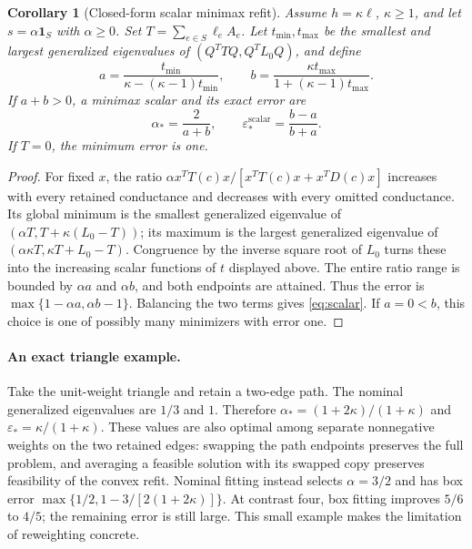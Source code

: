 \documentclass[11pt]{article}
\newtheorem{corollary}[theorem]{Corollary}
\newcommand{\one}{\mathbf 1}
\newcommand{\eps}{\varepsilon}
\begin{document}
\begin{corollary}[Closed-form scalar minimax refit]\label{cor:scalar}
Assume $h=\kappa\ell$, $\kappa\ge1$, and let $s=\alpha\one_S$ with $\alpha\ge0$. Set $T=\sum_{e\in S}\ell_eA_e$. Let $t_{\min},t_{\max}$ be the smallest and largest generalized eigenvalues of $(Q^TTQ,Q^TL_0Q)$, and define
\begin{equation}
a=\frac{t_{\min}}{\kappa-(\kappa-1)t_{\min}},\qquad
b=\frac{\kappa t_{\max}}{1+(\kappa-1)t_{\max}}.
\end{equation}
If $a+b>0$, a minimax scalar and its exact error are
\begin{equation}\label{eq:scalar}
\alpha_*=\frac{2}{a+b},\qquad\eps_*^{\mathrm{scalar}}=\frac{b-a}{b+a}.
\end{equation}
If $T=0$, the minimum error is one.
\end{corollary}
\begin{proof}
For fixed $x$, the ratio $\alpha x^TT(c)x/[x^TT(c)x+x^TD(c)x]$ increases with every retained conductance and decreases with every omitted conductance. Its global minimum is the smallest generalized eigenvalue of $(\alpha T,T+\kappa(L_0-T))$; its maximum is the largest generalized eigenvalue of $(\alpha\kappa T,\kappa T+L_0-T)$. Congruence by the inverse square root of $L_0$ turns these into the increasing scalar functions of $t$ displayed above. The entire ratio range is bounded by $\alpha a$ and $\alpha b$, and both endpoints are attained. Thus the error is $\max\{1-\alpha a,\alpha b-1\}$. Balancing the two terms gives \eqref{eq:scalar}. If $a=0<b$, this choice is one of possibly many minimizers with error one.
\end{proof}

\paragraph{An exact triangle example.}
Take the unit-weight triangle and retain a two-edge path. The nominal generalized eigenvalues are $1/3$ and $1$. Therefore $\alpha_*=(1+2\kappa)/(1+\kappa)$ and $\eps_*=\kappa/(1+\kappa)$. These values are also optimal among separate nonnegative weights on the two retained edges: swapping the path endpoints preserves the full problem, and averaging a feasible solution with its swapped copy preserves feasibility of the convex refit. Nominal fitting instead selects $\alpha=3/2$ and has box error $\max\{1/2,1-3/[2(1+2\kappa)]\}$. At contrast four, box fitting improves $5/6$ to $4/5$; the remaining error is still large. This small example makes the limitation of reweighting concrete.
\end{document}
